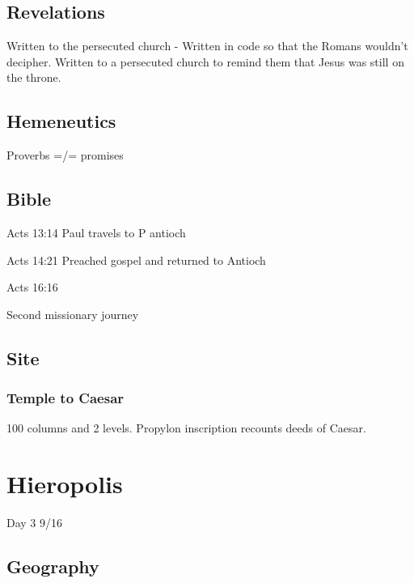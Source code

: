 \documentclass[
]{book}
\begin{document}
\hypertarget{revelations}{%
\section{Revelations}\label{revelations}}

Written to the persecuted church - Written in code so that the Romans wouldn't decipher. Written to a persecuted church to remind them that Jesus was still on the throne.

\hypertarget{hemeneutics}{%
\section{Hemeneutics}\label{hemeneutics}}

Proverbs =/= promises

\hypertarget{bible}{%
\section{Bible}\label{bible}}

Acts 13:14 Paul travels to P antioch

Acts 14:21 Preached gospel and returned to Antioch

Acts 16:16

Second missionary journey

\hypertarget{site-1}{%
\section{Site}\label{site-1}}

\hypertarget{temple-to-caesar}{%
\subsection{Temple to Caesar}\label{temple-to-caesar}}

100 columns and 2 levels. Propylon inscription recounts deeds of Caesar.

\hypertarget{hieropolis}{%
\chapter{Hieropolis}\label{hieropolis}}

Day 3 9/16

\hypertarget{geography-3}{%
\section{Geography}\label{geography-3}}
\end{document}
